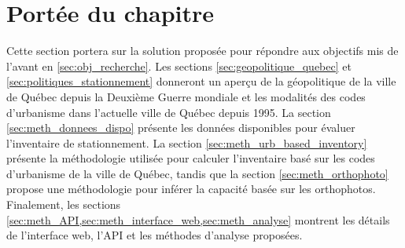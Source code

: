 \label{sec:Methodologie}
\section{Portée du chapitre}
Cette section portera sur la solution proposée pour répondre aux objectifs mis de l'avant en \ref{sec:obj_recherche}. Les sections \ref{sec:geopolitique_quebec} et \ref{sec:politiques_stationnement} donneront un aperçu de la géopolitique de la ville de Québec depuis la Deuxième Guerre mondiale et les modalités des codes d'urbanisme dans l'actuelle ville de Québec depuis 1995. La section \ref{sec:meth_donnees_dispo} présente les données disponibles pour évaluer l'inventaire de stationnement. La section \ref{sec:meth_urb_based_inventory} présente la méthodologie utilisée pour calculer l'inventaire basé sur les codes d'urbanisme de la ville de Québec, tandis que la section \ref{sec:meth_orthophoto} propose une méthodologie pour inférer la capacité basée sur les orthophotos. Finalement, les sections \ref{sec:meth_API,sec:meth_interface_web,sec:meth_analyse} montrent les détails de l'interface web, l'API et les méthodes d'analyse proposées.



  


     



